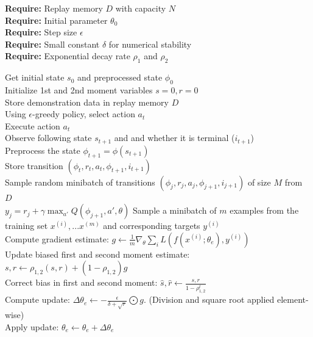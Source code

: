             \begin{algorithm}[H]\label{alg:7}
            
            \textbf{Require:} Replay memory $D$ with capacity $N$ \\
            \textbf{Require:} Initial parameter $\theta_0$ \\
            \textbf{Require:} Step size $\epsilon$ \\
            \textbf{Require:} Small constant $\delta $ for numerical stability \\
            \textbf{Require:} Exponential decay rate $\rho_1$ and $\rho_2$ \\
                {
                
                Get initial state $s_0$ and preprocessed state $\phi_0$ \\
                Initialize 1st and 2nd moment variables $s=0, r=0$ \\
                Store demonstration data in replay memory $D$ \\
                    {
                       Using $\epsilon$-greedy policy, select action $a_t$\\
                       Execute action $a_t$\\
                       Observe following state $s_{t+1}$ and and whether it is terminal ($i_{t+1}$)\\
                       Preprocess the state $\phi_{t+1}=\phi(s_{t+1})$ \\
                       Store transition $(\phi_{t},r_t,a_t,\phi_{t+1},i_{t+1})$\\
                       Sample random minibatch of transitions $(\phi_j,r_j,a_j,\phi_{j+1},i_{j+1})$   of size $M$ from $D$\\
                            {
                                {$y_j=r_j+\gamma \max_{a'}Q(\phi_{j+1},a',\theta)$}
                            }
                    }
                    Sample a minibatch of $m$ examples from the training set {$x^{(i)},...x^{(m)}$} and corresponding targets $y^{(i)}$ \\
                    Compute gradient estimate: $g \gets \frac{1}{m} \nabla_\theta \sum_i L(f(x^{(i)};\theta_e),y^{(i)}) $ \\
                    Update biased first and second moment estimate: $s,r \gets \rho_{1,2} (s,r)+ (1-\rho_{1,2})g$\\
                    Correct bias in first and second moment: $\hat{s},\hat{r} \gets \frac{s,r}{1-\rho_{1,2}^t}$\\
                    Compute update: $\Delta \theta_e \gets -\frac{\epsilon}{\delta+\sqrt{r}}\bigodot g.$ (Division and square root applied element-wise) \\
                    Apply update: $\theta_e \gets \theta_e +\Delta \theta_e$\\
                    
}
\end{algorithm}
